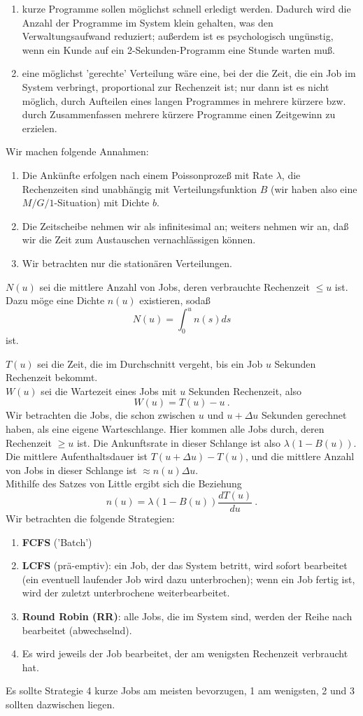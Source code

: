 \begin{enumerate}
\item kurze Programme sollen möglichst schnell erledigt werden. Dadurch wird die Anzahl der Programme im System klein gehalten, was den Verwaltungsaufwand
reduziert; außerdem ist es psychologisch ungünstig, wenn ein Kunde auf ein 2-Sekunden-Programm eine Stunde warten muß.
\item eine möglichst 'gerechte' Verteilung wäre eine, bei der die Zeit, die ein Job im System verbringt, proportional zur Rechenzeit ist; nur dann ist es nicht
möglich, durch Aufteilen eines langen Programmes in mehrere kürzere bzw. durch Zusammenfassen mehrere kürzere Programme einen Zeitgewinn zu erzielen.
\end{enumerate}

Wir machen folgende Annahmen:
\begin{enumerate}
\item Die Ankünfte erfolgen nach einem Poissonprozeß mit Rate $\lambda$, die Rechenzeiten sind unabhängig mit Verteilungsfunktion $B$ (wir haben also eine
$M/G/1$-Situation) mit Dichte $b$.
\item Die Zeitscheibe nehmen wir als infinitesimal an; weiters nehmen wir an, daß wir die Zeit zum Austauschen vernachlässigen können.
\item Wir betrachten nur die stationären Verteilungen.
\end{enumerate}
$N(u)$ sei die mittlere Anzahl von Jobs, deren verbrauchte Rechenzeit $\leq u$ ist. Dazu möge eine Dichte $n(u)$ existieren, sodaß
\[N(u)=\int_{0}^{u}n(s)ds  \]
ist.

$T(u)$ sei die Zeit, die im Durchschnitt vergeht, bis ein Job $u$ Sekunden Rechenzeit bekommt. \\
$W(u)$ sei die Wartezeit eines Jobs mit $u$ Sekunden Rechenzeit, also
\[W(u) = T(u) - u ~. \]
Wir betrachten die Jobs, die schon zwischen $u$ und $u+\Delta u$ Sekunden gerechnet haben, als eine eigene Warteschlange. Hier kommen alle Jobs durch, deren
Rechenzeit $\geq u$ ist. Die Ankunftsrate in dieser Schlange ist also $\lambda(1-B(u))$.\\
Die mittlere Aufenthaltsdauer ist $T(u+\Delta u) - T(u)$, und die mittlere Anzahl von Jobs in dieser Schlange ist $\approx n(u)\Delta u$. \\
Mithilfe des Satzes von Little ergibt sich die Beziehung
\[n(u)=\lambda (1-B(u))\frac{dT(u)}{du} ~.  \]
Wir betrachten die folgende Strategien:
\begin{enumerate}
\item {\bf FCFS} ('Batch')
\item {\bf LCFS} (prä-emptiv): ein Job, der das System betritt, wird sofort bearbeitet (ein eventuell laufender Job wird dazu unterbrochen); wenn ein Job fertig
ist, wird der zuletzt unterbrochene weiterbearbeitet.
\item {\bf {}Round Robin (RR)}: alle Jobs, die im System sind, werden der Reihe nach bearbeitet (abwechselnd).
\item Es wird jeweils der Job bearbeitet, der am wenigsten Rechenzeit verbraucht hat.
\end{enumerate}
Es sollte Strategie 4 kurze Jobs am meisten bevorzugen, 1 am wenigsten, 2 und 3 sollten dazwischen liegen.

